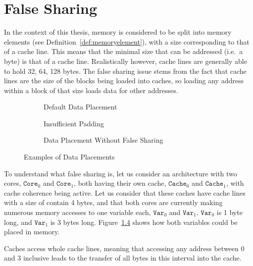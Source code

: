 \chapter{False Sharing}
\label{app:false_sharing}

In the context of this thesis, memory is considered to be split into memory
elements (see Definition~\ref{def:memoryelement}), with a size corresponding to
that of a cache line. This means that the minimal size that can be addressed
(i.e.~a byte) is that of a cache line. Realistically however, cache lines are
generally able to hold 32, 64, 128 bytes. The false sharing issue stems from the
fact that cache lines are the size of the blocks being loaded into caches, so
loading any address within a block of that size loads data for other addresses.

\begin{figure}[hbt!]
\begin{subfigure}[t]{\textwidth}
\caption{Default Data Placement}
\label{fig:false_sharing:default}
\end{subfigure}
\begin{subfigure}[t]{\textwidth}
\caption{Insufficient Padding}
\label{fig:false_sharing:wrong_padding}
\end{subfigure}
\begin{subfigure}[t]{\textwidth}
\caption{Data Placement Without False Sharing}
\label{fig:false_sharing:right_padding}
\end{subfigure}
\caption{Examples of Data Placements}
\label{fig:false_sharing:paddings}
\end{figure}

To understand what false sharing is, let us consider an architecture with two
cores, $\texttt{Core}_0$ and $\texttt{Core}_1$, both having their own cache,
$\texttt{Cache}_0$ and $\texttt{Cache}_1$, with cache coherence being active.
Let us consider that these caches have cache lines with a size of
contain 4 bytes, and that both cores are currently making numerous memory
accesses to one variable each, $\texttt{Var}_0$ and $\texttt{Var}_1$.
$\texttt{Var}_0$ is 1 byte long, and $\texttt{Var}_1$ is 3 bytes long.
Figure~\ref{fig:false_sharing:paddings} shows how both variables could be
placed in memory.

Caches access whole cache lines, meaning that accessing any address between
0 and 3 inclusive leads to the transfer of all bytes in this interval into the
cache.

